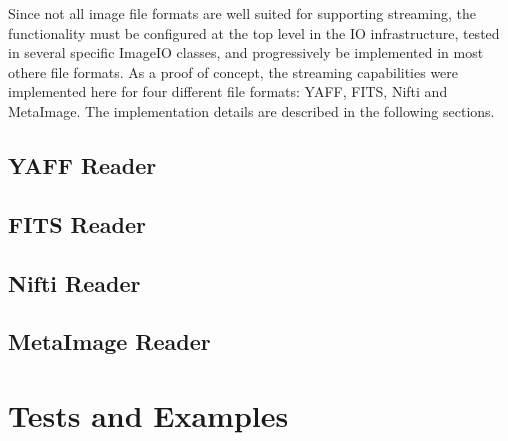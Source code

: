 \documentclass{InsightArticle}
\begin{document}
Since not all image file formats are well suited for supporting streaming, the
functionality must be configured at the top level in the IO infrastructure,
tested in several specific ImageIO classes, and progressively be implemented in
most othere file formats. As a proof of concept, the streaming capabilities
were implemented here for four different file formats: YAFF, FITS, Nifti and
MetaImage. The implementation details are described in the following sections.

\subsection{YAFF Reader}
\subsection{FITS Reader}
\subsection{Nifti Reader}
\subsection{MetaImage Reader}

\section{Tests and Examples}


%
%



\end{document}
